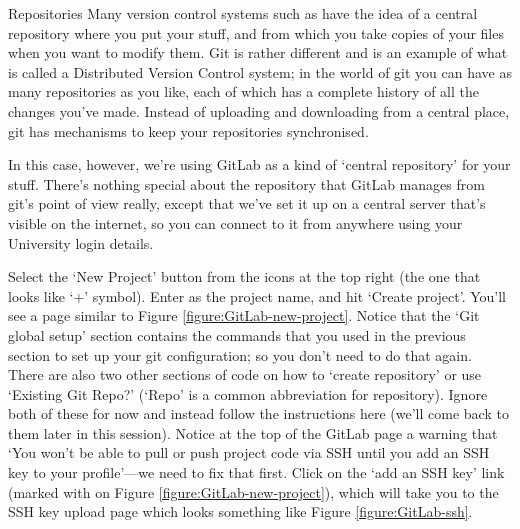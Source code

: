 \begin{diversion}{Repositories}
Many version control systems such as  have the idea of a central repository where you put your stuff, and from which you take copies of your files when you want to modify them. Git is rather different and is an example of what is called a Distributed Version Control system; in the world of git you can have as many repositories as you like, each of which has a complete history of all the changes you've made. Instead of uploading and downloading from a central place, git has mechanisms to keep your repositories synchronised. 

In this case, however, we're using GitLab as a kind of `central repository' for your stuff. There's nothing special about the repository that GitLab manages from git's point of view really, except that we've set it up on a central server that's visible on the internet, so you can connect to it from anywhere using your University login details.
\end{diversion}

Select the `New Project' button from the icons at the top right (the one that looks like `+' symbol). Enter  as the project name, and hit `Create project'. You'll see a page similar to Figure \ref{figure:GitLab-new-project}. Notice that the `Git global setup' section contains the commands that you used in the previous section to set up your git configuration; so you don't need to do that again. There are also two other sections of code on how to `create repository' or use `Existing Git Repo?' (`Repo' is a common abbreviation for repository). Ignore both of these for now and instead follow the instructions here (we'll come back to them later in this session). Notice at the top of the GitLab page a warning that `You won't be able to pull or push project code via SSH until you add an SSH key to your profile'---we need to fix that first. Click on the `add an SSH key' link (marked with \protect{} on Figure \ref{figure:GitLab-new-project}), which will take you to the SSH key upload page which looks something like Figure \ref{figure:GitLab-ssh}.

